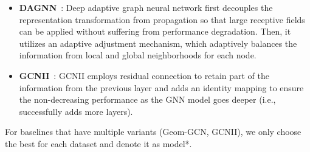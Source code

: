 \begin{itemize}[leftmargin=0.6cm]
    \item \textbf{DAGNN}~\cite{DAGNN}: Deep adaptive graph neural network first decouples the representation transformation from propagation so that large receptive fields can be applied without suffering from performance degradation. Then, it utilizes an adaptive adjustment mechanism, which adaptively balances the information from local and global neighborhoods for each node.
    
    \item \textbf{GCNII}~\cite{GCNII}: GCNII employs residual connection to retain part of the information from the previous layer and adds an identity mapping to ensure the non-decreasing performance as the GNN model goes deeper (i.e., successfully adds more layers).
\end{itemize}

For baselines that have multiple variants (Geom-GCN, GCNII), we only choose the best for each dataset and denote it as model*. 


